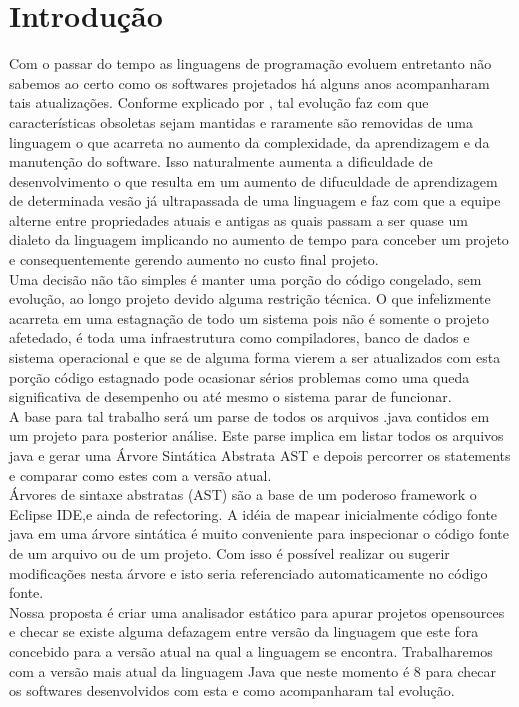 \chapter{Introdução}
Com o passar do tempo as linguagens de programação evoluem entretanto não sabemos ao certo como os softwares projetados há alguns anos acompanharam tais atualizações. Conforme explicado por \cite{Jeffrey_Ralph}, tal evolução faz com que características obsoletas sejam mantidas e raramente são removidas de uma linguagem o que acarreta no aumento da complexidade, da aprendizagem e da manutenção do software. Isso naturalmente aumenta a dificuldade de desenvolvimento o que resulta em um aumento de difuculdade de aprendizagem de determinada vesão  já ultrapassada de uma linguagem e faz com que a equipe alterne entre propriedades atuais e antigas as quais passam a ser quase um dialeto da linguagem implicando no aumento de tempo para conceber um projeto e consequentemente gerendo aumento no custo final projeto.\\


Uma decisão não tão simples é manter uma porção do código congelado, sem evolução, ao longo projeto devido alguma restrição técnica. O que infelizmente acarreta em uma estagnação de todo um sistema pois não é somente o projeto afetedado, é toda uma infraestrutura como compiladores, banco de dados e sistema operacional e que se de alguma forma vierem a ser atualizados com esta porção  código estagnado pode ocasionar sérios problemas como uma queda significativa de desempenho ou até mesmo o sistema parar de funcionar.\\



A base para tal trabalho será um parse de todos os arquivos .java contidos em um projeto para posterior análise. Este parse implica em listar todos os arquivos java e gerar uma Árvore Sintática Abstrata AST e depois percorrer os statements e comparar como estes com a versão atual.\\

Árvores de sintaxe abstratas (AST) são a base de um poderoso framework o Eclipse IDE,e ainda de refectoring. A idéia de mapear inicialmente código fonte java em uma árvore sintática  é muito conveniente para inspecionar o código fonte de um arquivo ou de um projeto. Com isso é possível realizar ou sugerir modificações nesta árvore e isto seria referenciado automaticamente no código fonte.\\




Nossa proposta é criar uma analisador estático para apurar projetos opensources e checar se existe alguma defazagem entre versão da linguagem que este fora concebido para a versão atual na qual a linguagem se encontra. Trabalharemos com a versão mais atual da linguagem Java que neste momento é 8 para checar os softwares desenvolvidos com esta e como acompanharam tal evolução.\\




